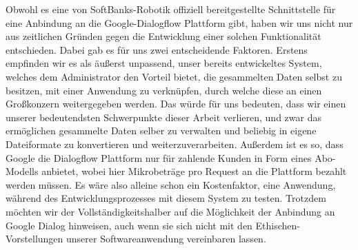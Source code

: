 Obwohl es eine von SoftBanks-Robotik offiziell bereitgestellte Schnittstelle für eine Anbindung an die Google-Dialogflow Plattform gibt, haben wir uns nicht nur aus zeitlichen Gründen gegen die Entwicklung einer solchen Funktionalität entschieden. Dabei gab es für uns zwei entscheidende Faktoren. Erstens empfinden wir es als äußerst unpassend, unser bereits entwickeltes System, welches dem Administrator den Vorteil bietet, die gesammelten Daten selbst zu besitzen, mit einer Anwendung zu verknüpfen, durch welche diese an einen Großkonzern weitergegeben werden. Das würde für uns bedeuten, dass wir einen unserer bedeutendsten Schwerpunkte dieser Arbeit verlieren, und zwar das ermöglichen gesammelte Daten selber zu verwalten und beliebig in eigene Dateiformate zu konvertieren und weiterzuverarbeiten. Außerdem ist es so, dass Google die Dialogflow Plattform nur für zahlende Kunden in Form eines Abo-Modells anbietet, wobei hier Mikrobeträge pro Request an die Plattform bezahlt werden müssen. Es wäre also alleine schon ein Kostenfaktor, eine Anwendung, während des Entwicklungsprozesses mit diesem System zu testen. Trotzdem möchten wir der Vollständigkeitshalber auf die Möglichkeit der Anbindung an Google Dialog hinweisen, auch wenn sie sich nicht mit den Ethischen-Vorstellungen unserer Softwareanwendung vereinbaren lassen.

